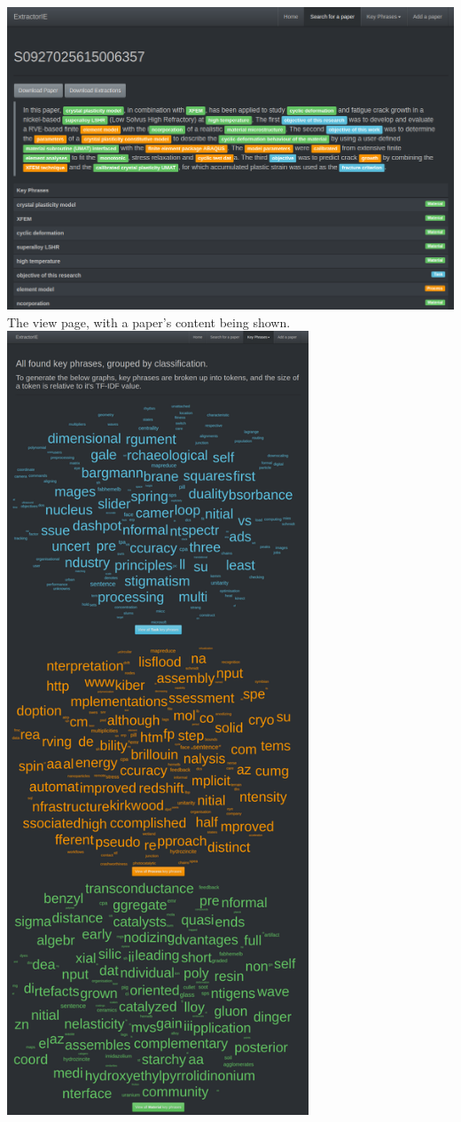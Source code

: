 \begin{appendices}
\begin{center}
	\includegraphics[width=\textwidth]{img/extractorie-view.png} \\
	\noindent The view page, with a paper's content being shown. \\
	\includegraphics[width=9cm]{img/extractorie-kp.png} \\

\end{center}
\end{appendices}
